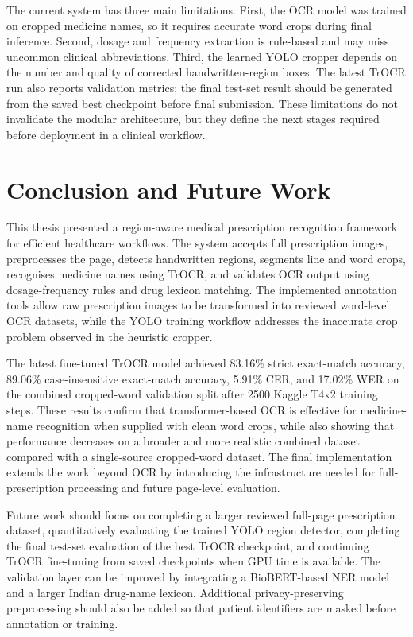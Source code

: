 \documentclass[modernstyle,12pt]{thesis}
\begin{document}
The current system has three main limitations. First, the OCR model was trained on cropped medicine names, so it requires accurate word crops during final inference. Second, dosage and frequency extraction is rule-based and may miss uncommon clinical abbreviations. Third, the learned YOLO cropper depends on the number and quality of corrected handwritten-region boxes. The latest TrOCR run also reports validation metrics; the final test-set result should be generated from the saved best checkpoint before final submission. These limitations do not invalidate the modular architecture, but they define the next stages required before deployment in a clinical workflow.

\chapter{Conclusion and Future Work}
\label{chap:conclusion}

This thesis presented a region-aware medical prescription recognition framework for efficient healthcare workflows. The system accepts full prescription images, preprocesses the page, detects handwritten regions, segments line and word crops, recognises medicine names using TrOCR, and validates OCR output using dosage-frequency rules and drug lexicon matching. The implemented annotation tools allow raw prescription images to be transformed into reviewed word-level OCR datasets, while the YOLO training workflow addresses the inaccurate crop problem observed in the heuristic cropper.

The latest fine-tuned TrOCR model achieved 83.16\% strict exact-match accuracy, 89.06\% case-insensitive exact-match accuracy, 5.91\% CER, and 17.02\% WER on the combined cropped-word validation split after 2500 Kaggle T4x2 training steps. These results confirm that transformer-based OCR is effective for medicine-name recognition when supplied with clean word crops, while also showing that performance decreases on a broader and more realistic combined dataset compared with a single-source cropped-word dataset. The final implementation extends the work beyond OCR by introducing the infrastructure needed for full-prescription processing and future page-level evaluation.

Future work should focus on completing a larger reviewed full-page prescription dataset, quantitatively evaluating the trained YOLO region detector, completing the final test-set evaluation of the best TrOCR checkpoint, and continuing TrOCR fine-tuning from saved checkpoints when GPU time is available. The validation layer can be improved by integrating a BioBERT-based NER model and a larger Indian drug-name lexicon. Additional privacy-preserving preprocessing should also be added so that patient identifiers are masked before annotation or training.



\end{document}
